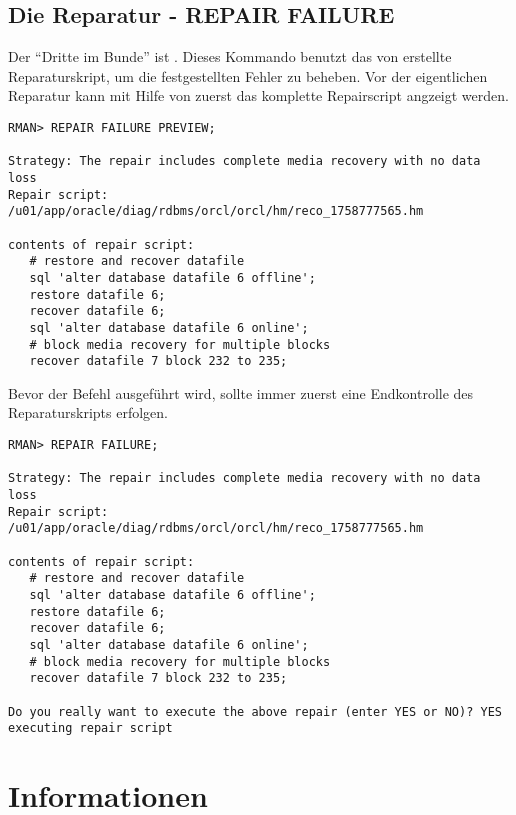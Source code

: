       \subsection{Die Reparatur - REPAIR FAILURE}
        Der \enquote{Dritte im Bunde} ist . Dieses
        Kommando benutzt das von  erstellte
        Reparaturskript, um die festgestellten Fehler zu beheben. Vor der
        eigentlichen Reparatur kann mit Hilfe von  zuerst das komplette Repairscript angzeigt werden.
\clearpage
        \begin{lstlisting}[caption={Eine Vorschau auf das Repairscript},label=admin1542,language=rman]
RMAN> REPAIR FAILURE PREVIEW;

Strategy: The repair includes complete media recovery with no data loss
Repair script: /u01/app/oracle/diag/rdbms/orcl/orcl/hm/reco_1758777565.hm

contents of repair script:
   # restore and recover datafile
   sql 'alter database datafile 6 offline';
   restore datafile 6;
   recover datafile 6;
   sql 'alter database datafile 6 online';
   # block media recovery for multiple blocks
   recover datafile 7 block 232 to 235;
        \end{lstlisting}
        Bevor der Befehl  ausgeführt wird, sollte immer zuerst eine Endkontrolle des Reparaturskripts erfolgen.
        \begin{lstlisting}[caption={Die Fehler reparieren},label=admin1543,language=rman]
RMAN> REPAIR FAILURE;

Strategy: The repair includes complete media recovery with no data loss
Repair script: /u01/app/oracle/diag/rdbms/orcl/orcl/hm/reco_1758777565.hm

contents of repair script:
   # restore and recover datafile
   sql 'alter database datafile 6 offline';
   restore datafile 6;
   recover datafile 6;
   sql 'alter database datafile 6 online';
   # block media recovery for multiple blocks
   recover datafile 7 block 232 to 235;

Do you really want to execute the above repair (enter YES or NO)? YES
executing repair script
        \end{lstlisting}
\clearpage
    \section{Informationen}
